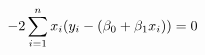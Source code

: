 \documentclass[preview]{standalone}
\begin{document}
\begin{align*}
\special{dvisvgm:raw <g id='unique000'>}-2 \special{dvisvgm:raw </g>}\special{dvisvgm:raw <g id='unique001'>}\sum_{i=1}^n{x_i(y_i-(\beta_0+\beta_1 x_i))}=0\special{dvisvgm:raw </g>}
\end{align*}
\end{document}
